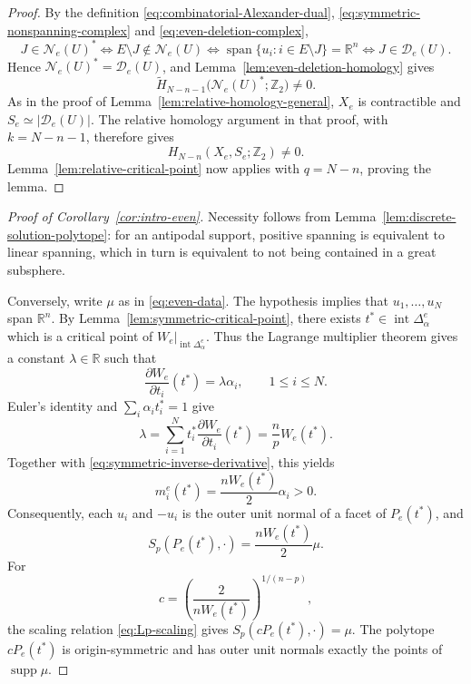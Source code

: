 \documentclass[12pt,reqno]{amsart}
\numberwithin{equation}{section}
\theoremstyle{remark}
\newtheorem{remark}[theorem]{Remark}
\DeclareMathOperator{\spanop}{span}
\DeclareMathOperator{\supp}{supp}
\newcommand{\R}{\mathbb R}
\newcommand{\Ncal}{\mathcal N}
\newcommand{\Dcal}{\mathcal D}
\begin{document}
\begin{proof}
	By the definition \eqref{eq:combinatorial-Alexander-dual}, \eqref{eq:symmetric-nonspanning-complex} and \eqref{eq:even-deletion-complex},
	\[
	J\in\Ncal_e(U)^*
	\iff
	E\setminus J\notin\Ncal_e(U)
	\iff
	\spanop\{u_i:i\in E\setminus J\}=\R^n
	\iff
	J\in\Dcal_e(U).
	\]
	Hence \(\Ncal_e(U)^*=\Dcal_e(U)\), and
	Lemma~\ref{lem:even-deletion-homology} gives
	\[
	\widetilde H_{N-n-1}
	\bigl(\Ncal_e(U)^*;\mathbb Z_2\bigr)\neq0.
	\]
	As in the proof of Lemma~\ref{lem:relative-homology-general},
	\(X_e\) is contractible and
	\(S_e\simeq\lvert\Dcal_e(U)\rvert\).
	The relative homology argument in that proof, with
	\(k=N-n-1\), therefore gives
	\[
	H_{N-n}(X_e,S_e;\mathbb Z_2)\neq0.
	\]
	Lemma~\ref{lem:relative-critical-point} now applies with
	\(q=N-n\), proving the lemma.
\end{proof}

\begin{proof}[Proof of Corollary~\ref{cor:intro-even}]
	Necessity follows from Lemma~\ref{lem:discrete-solution-polytope}:
	for an antipodal support, positive spanning is equivalent to linear
	spanning, which in turn is equivalent to not being contained in a
	great subsphere.
	
	Conversely, write \(\mu\) as in \eqref{eq:even-data}. The hypothesis
	implies that \(u_1,\ldots,u_N\) span \(\R^n\). 
By Lemma~\ref{lem:symmetric-critical-point}, there exists
\(t^*\in\operatorname{int}\Delta_\alpha^e\) which is a critical
point of \(W_e|_{\operatorname{int}\Delta_\alpha^e}\).
Thus the Lagrange multiplier theorem gives a constant \(\lambda\in\R\)
such that
\[
\frac{\partial W_e}{\partial t_i}(t^*)
=
\lambda\alpha_i,
\qquad 1\leq i\leq N.
\]
	Euler's identity and \(\sum_i\alpha_it_i^*=1\) give
	\[
	\lambda
	=
	\sum_{i=1}^Nt_i^*\frac{\partial W_e}{\partial t_i}(t^*)
	=
	\frac np W_e(t^*).
	\]
	Together with \eqref{eq:symmetric-inverse-derivative}, this yields
	\[
	m_i^e(t^*)
	=
	\frac{nW_e(t^*)}{2}\alpha_i>0.
	\]
	Consequently, each \(u_i\) and \(-u_i\) is the outer unit normal of
	a facet of \(P_e(t^*)\), and
	\[
	S_p(P_e(t^*),\cdot)
	=
	\frac{nW_e(t^*)}{2}\mu.
	\]
	For
	\[
	c=\left(\frac{2}{nW_e(t^*)}\right)^{1/(n-p)},
	\]
	the scaling relation \eqref{eq:Lp-scaling} gives
	\(S_p(cP_e(t^*),\cdot)=\mu\). The polytope \(cP_e(t^*)\) is
	origin-symmetric and has outer unit normals exactly the points of
	\(\supp\mu\).
\end{proof}

\end{document}
